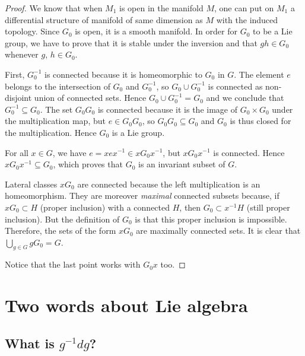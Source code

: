 \begin{proof}
We know that when $M_{1}$ is open in the manifold $M$, one can put on $M_{1}$ a differential structure of manifold of same dimension as $M$ with the induced topology. Since $G_0$ is open, it is a smooth manifold. In order for $G_0$ to be a Lie group, we have to prove that it is stable under the inversion and that $gh\in G_0$ whenever $g$, $h\in G_0$.

First, $G_0^{-1}$ is connected because  it is homeomorphic to $G_0$ in $G$. The element $e$ belongs to the intersection of $G_0$ and $G_0^{-1}$, so $G_0\cup G_0^{-1}$ is connected as non-disjoint union of connected sets. Hence $G_0\cup G_0^{-1}=G_0$ and we conclude that $G_0^{-1}\subseteq G_0$. The set $G_0G_0$ is connected because it is the image of $G_0\times G_0$ under the multiplication map, but $e\in G_0G_0$, so $G_0G_0\subseteq G_0$ and  $G_0$ is thus closed for the multiplication. Hence $G_0$ is a Lie group.

For all $x\in G$, we have $e=xex^{-1}\in xG_0x^{-1}$, but $xG_0x^{-1}$ is connected. Hence $xG_0x^{-1}\subseteq G_0$, which proves that $G_0$ is an invariant subset of $G$.

Lateral classes $xG_0$ are connected because the left multiplication is an homeomorphism. They are moreover \emph{maximal} connected subsets because, if $xG_0\subset H$ (proper inclusion) with a connected $H$, then $G_0\subset x^{-1}H$ (still proper inclusion). But the definition of $G_0$ is that this proper inclusion is impossible. Therefore, the sets of the form $xG_0$ are maximally connected sets. It is clear that $\bigcup_{g\in G}gG_0=G$.

Notice that the last point works with $G_0x$ too.
\end{proof}

\section{Two words about Lie algebra}

\subsection{What is  \texorpdfstring{$g^{-1} dg$}{g-1dg}?}\label{SubSecgmudg}

